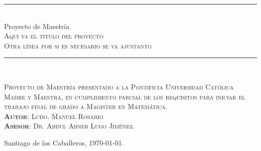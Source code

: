 \BgThispage
\begin{titlepage}
\begin{flushright}
\begin{minipage}{12cm}
\begin{center}
\membrete
\end{center}
\end{minipage}
\end{flushright}
\vfill
\begin{flushright}
\begin{minipage}{12cm}
\begin{center}
\vskip 1cm \rule{12cm}{3pt}\\[1mm]
{\Large Proyecto de Maestría}\\[1mm]
{\Large \textsc{Aquí va el título del proyecto}\\[1mm]
\textsc{Otra línea por si es necesario se va ajustanto}}
\rule{12cm}{3pt}\\[6mm]
\end{center}
\end{minipage}
\end{flushright}
\vfill
\begin{flushright}
\begin{minipage}{12cm}
\begin{center}
\textsc{Proyecto de Maestría presentado a la Pontificia Universidad Católica Madre y Maestra, en 
cumplimiento parcial de los requisitos para iniciar el trabajo final de grado a Magister en Matemática.}\\[2cm]
\textsc{{\bf Autor}: Lcdo. Manuel Rosario}\\[2mm]
\textsc{{\bf Asesor}: Dr. Abdul Abner Lugo Jiménez.}
\end{center}
\end{minipage}
\end{flushright}
\vfill
\begin{flushright}
\begin{minipage}{12cm}
\begin{center}
Santiago de los Caballeros, \today.
\end{center}
\end{minipage}
\end{flushright}
\end{titlepage}



